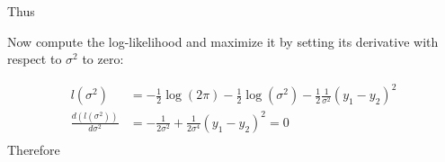 \documentclass[paper=a4, fontsize=11pt]{scrartcl} %
\begin{document}
Thus
\begin{center}
\end{center}
\bigskip
\bigskip
Now compute the log-likelihood and maximize it by setting its derivative with respect to $\sigma^2$ to zero:

\begin{align*}
l(\sigma^2) &= -\frac{1}{2} \log(2 \pi) -\frac{1}{2} \log(\sigma^2) -\frac{1}{2} \frac{1}{\sigma^2} (y_1 - y_2)^2\\
\frac{d (l(\sigma^2) )} {d \sigma^2} &=  -\frac{1}{2 \sigma^2} + \frac{1}{2 \sigma^4} (y_1 - y_2)^2 = 0\\
\end{align*}
Therefore
\begin{center}
\end{center}
\end{document}
